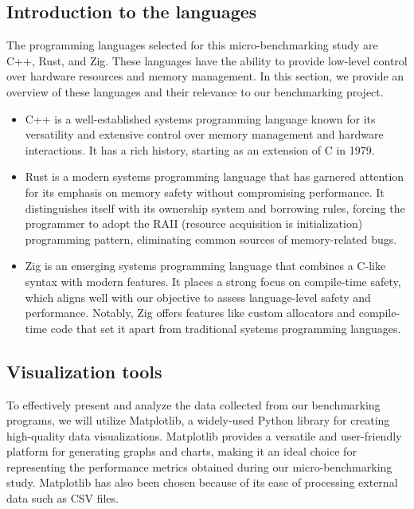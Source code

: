 \documentclass{article}
\begin{document}
\subsection{Introduction to the languages}
The programming languages selected for this micro-benchmarking study are C++, Rust, and Zig. These languages have the ability to provide low-level control over hardware resources and memory management. In this section, we provide an overview of these languages and their relevance to our benchmarking project.
\begin{itemize}
    \item C++ is a well-established systems programming language known for its versatility and extensive control over memory management and hardware interactions. It has a rich history, starting as an extension of C in 1979.
    \item Rust is a modern systems programming language that has garnered attention for its emphasis on memory safety without compromising performance. It distinguishes itself with its ownership system and borrowing rules, forcing the programmer to adopt the RAII (resource acquisition is initialization) programming pattern, eliminating common sources of memory-related bugs.
    \item Zig is an emerging systems programming language that combines a C-like syntax with modern features. It places a strong focus on compile-time safety, which aligns well with our objective to assess language-level safety and performance. Notably, Zig offers features like custom allocators and compile-time code that set it apart from traditional systems programming languages.
\end{itemize}

\subsection{Visualization tools}
To effectively present and analyze the data collected from our benchmarking programs, we will utilize Matplotlib, a widely-used Python library for creating high-quality data visualizations. Matplotlib provides a versatile and user-friendly platform for generating graphs and charts, making it an ideal choice for representing the performance metrics obtained during our micro-benchmarking study. Matplotlib has also been chosen because of its ease of processing external data such as CSV files.
\clearpage
\end{document}
